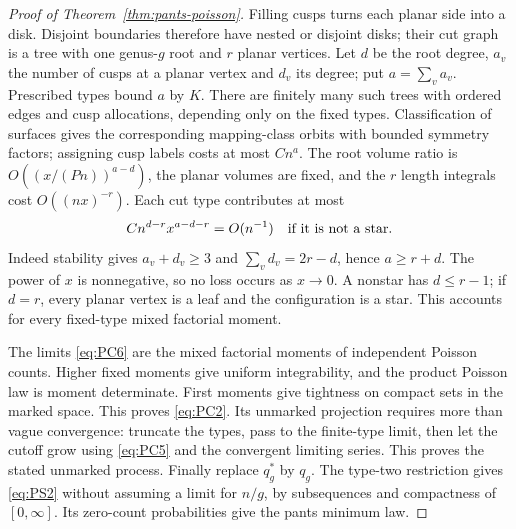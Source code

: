 \begin{proof}[Proof of Theorem~\ref{thm:pants-poisson}]
Filling cusps turns each planar side into a disk. Disjoint boundaries
therefore have nested or disjoint disks; their cut graph is a tree with
one genus-$g$ root and $r$ planar vertices. Let $d$ be the root degree,
$a_v$ the number of cusps at a planar vertex and $d_v$ its degree;
put $a=\sum_v a_v$. Prescribed types bound $a$ by $K$.
There are finitely many such trees with ordered edges and cusp
allocations, depending only on the fixed types. Classification of
surfaces gives the corresponding mapping-class orbits with bounded
symmetry factors; assigning cusp labels costs at most $Cn^a$.
The root volume ratio is $O((x/(Pn))^{a-d})$, the planar volumes
are fixed, and the $r$ length integrals cost $O((nx)^{-r})$.
Each cut type contributes at most
\begin{equation}
 Cn^{d-r}x^{a-d-r}=O(n^{-1})\quad\hbox{if it is not a star}.
 \label{eq:PC7}
\end{equation}
Indeed stability gives $a_v+d_v\ge3$ and
$\sum_vd_v=2r-d$, hence $a\ge r+d$. The power of $x$ is
nonnegative, so no loss occurs as $x\to0$. A nonstar has $d\le r-1$;
if $d=r$, every planar vertex is a leaf and the configuration is a star.
This accounts for every fixed-type mixed factorial moment.

The limits \eqref{eq:PC6} are the mixed factorial moments of independent
Poisson counts. Higher fixed moments give uniform integrability, and
the product Poisson law is moment determinate. First moments give
tightness on compact sets in the marked space. This proves
\eqref{eq:PC2}. Its unmarked projection requires more than vague
convergence: truncate the types, pass to the finite-type limit, then
let the cutoff grow using \eqref{eq:PC5} and the convergent limiting
series. This proves the stated unmarked process. Finally replace
$q_g^*$ by $q_g$. The type-two restriction gives \eqref{eq:PS2}
without assuming a limit for $n/g$, by subsequences and compactness of
$[0,\infty]$. Its zero-count probabilities give the pants minimum law.


\end{proof}
